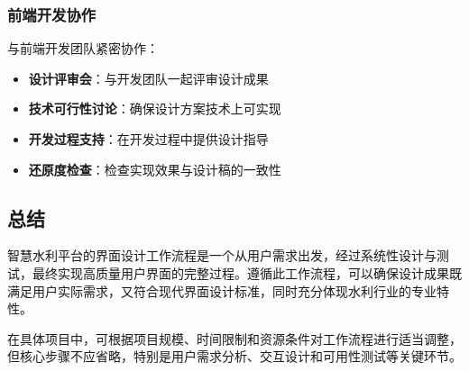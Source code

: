 \subsubsection{前端开发协作}\label{ux524dux7aefux5f00ux53d1ux534fux4f5c}

与前端开发团队紧密协作：

\begin{itemize}
\tightlist
\item
  \textbf{设计评审会}：与开发团队一起评审设计成果
\item
  \textbf{技术可行性讨论}：确保设计方案技术上可实现
\item
  \textbf{开发过程支持}：在开发过程中提供设计指导
\item
  \textbf{还原度检查}：检查实现效果与设计稿的一致性
\end{itemize}

\subsection{总结}\label{ux603bux7ed3}

智慧水利平台的界面设计工作流程是一个从用户需求出发，经过系统性设计与测试，最终实现高质量用户界面的完整过程。遵循此工作流程，可以确保设计成果既满足用户实际需求，又符合现代界面设计标准，同时充分体现水利行业的专业特性。

在具体项目中，可根据项目规模、时间限制和资源条件对工作流程进行适当调整，但核心步骤不应省略，特别是用户需求分析、交互设计和可用性测试等关键环节。
